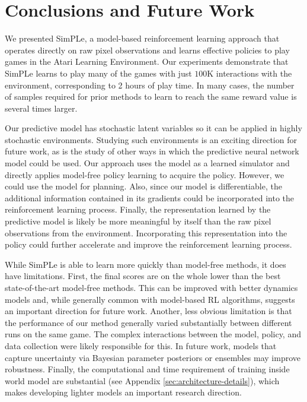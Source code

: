 \section{Conclusions and Future Work}

We presented SimPLe, a model-based reinforcement learning approach that operates directly on raw pixel observations and learns effective policies to play games in the Atari Learning Environment. Our experiments demonstrate that SimPLe learns to play many of the games with just $100$K interactions with the environment, corresponding to 2 hours of play time. In many cases, the number of samples required for prior methods to learn to reach the same reward value is several times larger.

Our predictive model has stochastic latent variables so it can be applied in highly stochastic environments. Studying such environments is an exciting direction for future work, as is the study of other ways in which the predictive neural network model could be used. Our approach uses the model as a learned simulator and directly applies model-free policy learning to acquire the policy. However, we could use the model for planning. Also, since our model is differentiable, the additional information contained in its gradients could be incorporated into the reinforcement learning process. Finally, the representation learned by the predictive model is likely be more meaningful by itself than the raw pixel observations from the environment. Incorporating this representation into the policy could further accelerate and improve the reinforcement learning process.

While SimPLe is able to learn more quickly than model-free methods, it does have limitations. First, the final scores are on the whole lower than the best state-of-the-art model-free methods. This can be improved with better dynamics models and, while generally common with model-based RL algorithms, suggests an important direction for future work. Another, less obvious limitation is that the performance of our method generally varied substantially between different runs on the same game. The complex interactions between the model, policy, and data collection were likely responsible for this. In future work, models that capture uncertainty via Bayesian parameter posteriors or ensembles \citep{trpo_ensemble, Chua18} may improve robustness.
Finally, the computational and time requirement of training inside world model are substantial (see Appendix \ref{sec:architecture-details}), which makes developing lighter models an important research direction.

